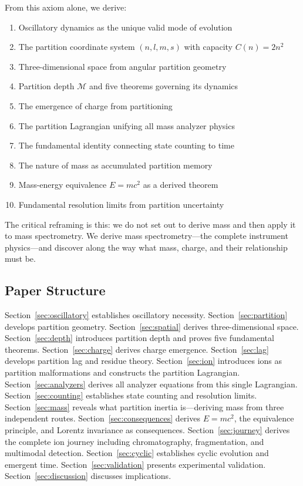 \documentclass[twocolumn,10pt,a4paper]{article}
\theoremstyle{definition}
\theoremstyle{remark}
\newcommand{\Depth}{\mathcal{M}}
\begin{document}
From this axiom alone, we derive:
\begin{enumerate}[label=(\roman*)]
    \item Oscillatory dynamics as the unique valid mode of evolution
    \item The partition coordinate system $(n, l, m, s)$ with capacity $C(n) = 2n^2$
    \item Three-dimensional space from angular partition geometry
    \item Partition depth $\Depth$ and five theorems governing its dynamics
    \item The emergence of charge from partitioning
    \item The partition Lagrangian unifying all mass analyzer physics
    \item The fundamental identity connecting state counting to time
    \item The nature of mass as accumulated partition memory
    \item Mass-energy equivalence $E = mc^2$ as a derived theorem
    \item Fundamental resolution limits from partition uncertainty
\end{enumerate}

The critical reframing is this: we do not set out to derive mass and then apply it to mass spectrometry. We derive mass spectrometry---the complete instrument physics---and discover along the way what mass, charge, and their relationship must be.

\subsection{Paper Structure}

Section~\ref{sec:oscillatory} establishes oscillatory necessity. Section~\ref{sec:partition} develops partition geometry. Section~\ref{sec:spatial} derives three-dimensional space. Section~\ref{sec:depth} introduces partition depth and proves five fundamental theorems. Section~\ref{sec:charge} derives charge emergence. Section~\ref{sec:lag} develops partition lag and residue theory. Section~\ref{sec:ion} introduces ions as partition malformations and constructs the partition Lagrangian. Section~\ref{sec:analyzers} derives all analyzer equations from this single Lagrangian. Section~\ref{sec:counting} establishes state counting and resolution limits. Section~\ref{sec:mass} reveals what partition inertia is---deriving mass from three independent routes. Section~\ref{sec:consequences} derives $E = mc^2$, the equivalence principle, and Lorentz invariance as consequences. Section~\ref{sec:journey} derives the complete ion journey including chromatography, fragmentation, and multimodal detection. Section~\ref{sec:cyclic} establishes cyclic evolution and emergent time. Section~\ref{sec:validation} presents experimental validation. Section~\ref{sec:discussion} discusses implications.
\end{document}
